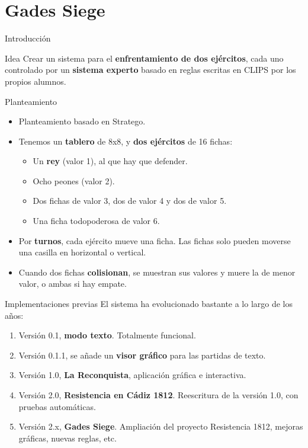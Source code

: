 \documentclass[smaller,spanish,xcolor=svgnames]{beamer}
\begin{document}
\section{Gades Siege}

\begin{frame}{Introducción}
  \begin{block}{Idea}
    Crear un sistema para el \textbf{enfrentamiento de dos ejércitos}, cada uno
    controlado por un \textbf{sistema experto} basado en reglas escritas en
    CLIPS por los propios alumnos.
  \end{block}

\end{frame}

\begin{frame}{Planteamiento}
  \begin{block}{}
    \begin{itemize}
    \item Planteamiento basado en Stratego.
    \item Tenemos un \textbf{tablero} de 8x8, y \textbf{dos ejércitos} de 16 fichas:
      \begin{itemize}
      \item Un \textbf{rey} (valor 1), al que hay que defender.
      \item Ocho peones (valor 2).
      \item Dos fichas de valor 3, dos de valor 4 y dos de valor 5.
      \item Una ficha todopoderosa de valor 6.
      \end{itemize}
    \item Por \textbf{turnos}, cada ejército mueve una ficha. Las fichas solo
      pueden moverse una casilla en horizontal o vertical.
    \item Cuando dos fichas \textbf{colisionan}, se muestran sus valores y muere la de
      menor valor, o ambas si hay empate.
    \end{itemize}
  \end{block} 
\end{frame}

\begin{frame}{Implementaciones previas}
El sistema ha evolucionado bastante a lo largo de los años:
\begin{enumerate}
\item Versión 0.1, \textbf{modo texto}. Totalmente funcional.
\item Versión 0.1.1, se añade un \textbf{visor gráfico} para las partidas de texto.
\item Versión 1.0, \textbf{La Reconquista}, aplicación gráfica e interactiva.
\item Versión 2.0, \textbf{Resistencia en Cádiz 1812}. Reescritura de la versión 1.0, con
  pruebas automáticas.
\item Versión 2.x, \textbf{Gades Siege}. Ampliación del proyecto Resistencia 1812,
  mejoras gráficas, nuevas reglas, etc.
\end{enumerate}
  
\end{frame}
\end{document}
